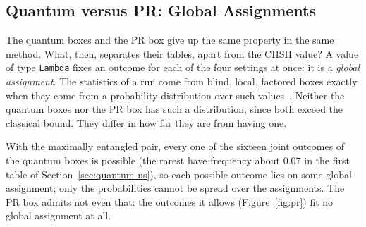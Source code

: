 \documentclass[11pt]{article}
\newcommand{\hs}{\lstinline[style=hask,basicstyle=\ttfamily,frame=none]}
\begin{document}
\subsection{Quantum versus PR: Global Assignments}\label{sec:contextuality}

The quantum boxes and the PR box give up the same property in the same method. What, then, separates their tables, apart from the CHSH value? A value of type \hs|Lambda| fixes an outcome for each of the four settings at once: it is a \emph{global assignment}. The statistics of a run come from blind, local, factored boxes exactly when they come from a probability distribution over such values~\citep{Fine1982,AbramskyBrandenburger2011}. Neither the quantum boxes nor the PR box has such a distribution, since both exceed the classical bound. They differ in how far they are from having one.

With the maximally entangled pair, every one of the sixteen joint outcomes of the quantum boxes is possible (the rarest have frequency about $0.07$ in the first table of Section~\ref{sec:quantum-ns}), so each possible outcome lies on some global assignment; only the probabilities cannot be spread over the assignments. The PR box admits not even that: the outcomes it allows (Figure~\ref{fig:pr}) fit no global assignment at all.
\end{document}
